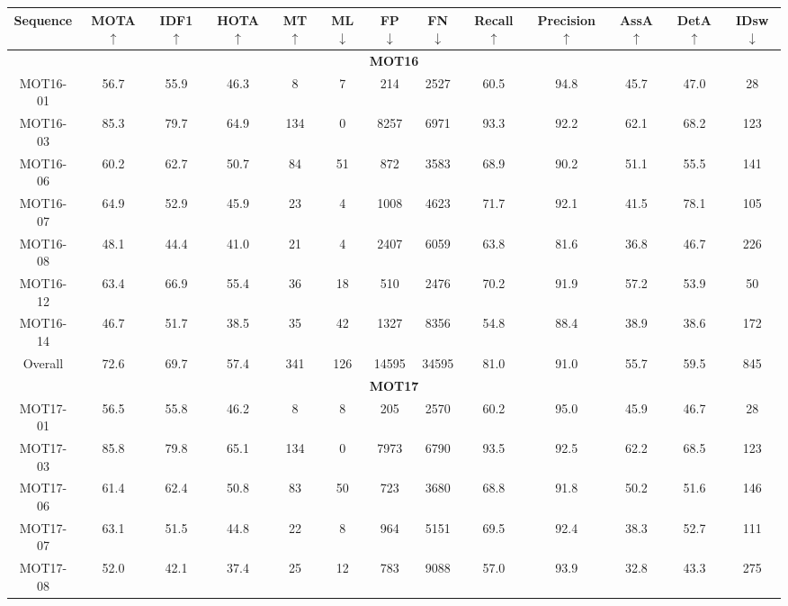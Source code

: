 \begin{table*}[t!]
    \small
    \centering
    \setlength\tabcolsep{4.5pt}
    \begin{tabular}{c|cccccccccccc}
    \toprule[1.5pt]
        \textbf{Sequence} &\textbf{MOTA}  $\uparrow$ & \textbf{IDF1} $\uparrow$ & \textbf{HOTA} $\uparrow$ & \textbf{MT} $\uparrow$ & \textbf{ML} $\downarrow$ & \textbf{FP} $\downarrow$ & \textbf{FN} $\downarrow$ & \textbf{Recall} $\uparrow$ & \textbf{Precision} $\uparrow$ & \textbf{AssA} $\uparrow$ & \textbf{DetA} $\uparrow$ & \textbf{IDsw} $\downarrow$  \\\hline
         \multicolumn{13}{c}{\textbf{MOT16} \cite{milan2016mot16}} \\\hline\hline
         MOT16-01 & 56.7 & 55.9 & 46.3 & 8 & 7 & 214 & 2527 & 60.5 & 94.8 & 45.7 & 47.0 & 28\\
         MOT16-03 & 85.3 & 79.7 & 64.9 & 134 & 0 & 8257 & 6971 & 93.3 & 92.2 & 62.1 & 68.2 & 123\\
         MOT16-06 & 60.2 & 62.7 & 50.7 & 84 & 51 & 872 & 3583 & 68.9 & 90.2 & 51.1 & 55.5 & 141\\
         MOT16-07 & 64.9 & 52.9 & 45.9 & 23 & 4 & 1008 & 4623 & 71.7 & 92.1 & 41.5 & 78.1 & 105\\
         MOT16-08 & 48.1 & 44.4 & 41.0 & 21 & 4 & 2407 & 6059 & 63.8 & 81.6 & 36.8 & 46.7 & 226\\
         MOT16-12 & 63.4 & 66.9 & 55.4 & 36 & 18 & 510 & 2476 & 70.2 & 91.9 & 57.2 & 53.9 & 50 \\
         MOT16-14 & 46.7 & 51.7 & 38.5 & 35 & 42 & 1327 & 8356 & 54.8 & 88.4 & 38.9 & 38.6 & 172\\
         Overall & 72.6 & 69.7 & 57.4 & 341 & 126 & 14595 & 34595 & 81.0 & 91.0 & 55.7 & 59.5 & 845 \\\hline
         \multicolumn{13}{c}{\textbf{MOT17} \cite{milan2016mot16}} \\\hline\hline
         MOT17-01 & 56.5 & 55.8 & 46.2 & 8 & 8 & 205 & 2570 & 60.2 & 95.0 & 45.9 & 46.7 & 28 \\
         MOT17-03 & 85.8 & 79.8 & 65.1 & 134 & 0 & 7973 & 6790 & 93.5 & 92.5 & 62.2 & 68.5 & 123 \\
         MOT17-06 & 61.4 & 62.4 & 50.8 & 83 & 50 & 723 & 3680 & 68.8 & 91.8 & 50.2 & 51.6 & 146\\
         MOT17-07 & 63.1 & 51.5 & 44.8 & 22 & 8 & 964 & 5151 & 69.5 & 92.4 & 38.3 & 52.7 & 111 \\
         MOT17-08 & 52.0 & 42.1 & 37.4 & 25 & 12 & 783 & 9088 & 57.0 & 93.9 & 32.8 & 43.3 & 275 \\

\end{tabular}
\end{table*}
